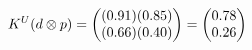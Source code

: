 \documentclass[preview]{standalone}
\begin{document}
\begin{align*}
\special{dvisvgm:raw <g id='unique000'>}K^U(d \otimes p) = \begin{pmatrix} (0.91)(0.85) \\ (0.66)(0.40) \end{pmatrix} = \begin{pmatrix} 0.78 \\ 0.26 \end{pmatrix}\special{dvisvgm:raw </g>}
\end{align*}
\end{document}
